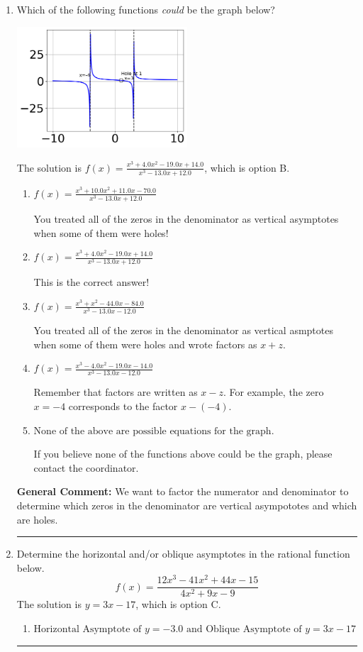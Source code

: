 \documentclass{extbook}[14pt]
\newcommand{\litem}[1]{\item #1

\rule{\textwidth}{0.4pt}}
\begin{document}
\begin{enumerate}\litem{
Which of the following functions \textit{could} be the graph below?

\begin{center}
    \includegraphics[width=0.5\textwidth]{../Figures/identifyGraphOfRationalFunctionA.png}
\end{center}


The solution is \( f(x)=\frac{x^{3} +4.0 x^{2} -19.0 x + 14.0}{x^{3} -13.0 x + 12.0} \), which is option B.\begin{enumerate}[label=\Alph*.]
\item \( f(x)=\frac{x^{3} +10.0 x^{2} +11.0 x -70.0}{x^{3} -13.0 x + 12.0} \)

You treated all of the zeros in the denominator as vertical asymptotes when some of them were holes!
\item \( f(x)=\frac{x^{3} +4.0 x^{2} -19.0 x + 14.0}{x^{3} -13.0 x + 12.0} \)

This is the correct answer!
\item \( f(x)=\frac{x^{3} + x^{2} -44.0 x -84.0}{x^{3} -13.0 x -12.0} \)

You treated all of the zeros in the denominator as vertical asmptotes when some of them were holes and wrote factors as $x+z$.
\item \( f(x)=\frac{x^{3} -4.0 x^{2} -19.0 x -14.0}{x^{3} -13.0 x -12.0} \)

Remember that factors are written as $x-z$. For example, the zero $x=-4$ corresponds to the factor $x-(-4)$.
\item \( \text{None of the above are possible equations for the graph.} \)

If you believe none of the functions above could be the graph, please contact the coordinator.
\end{enumerate}

\textbf{General Comment:} We want to factor the numerator and denominator to determine which zeros in the denominator are vertical asympototes and which are holes.
}
\litem{
Determine the horizontal and/or oblique asymptotes in the rational function below.
\[ f(x) = \frac{12x^{3} -41 x^{2} +44 x -15}{4x^{2} +9 x -9} \]The solution is \( y = 3x -17 \), which is option C.\begin{enumerate}[label=\Alph*.]
\item \( \text{Horizontal Asymptote of } y = -3.0 \text{ and Oblique Asymptote of } y = 3x -17 \)


\end{enumerate}}
\end{enumerate}
\end{document}
